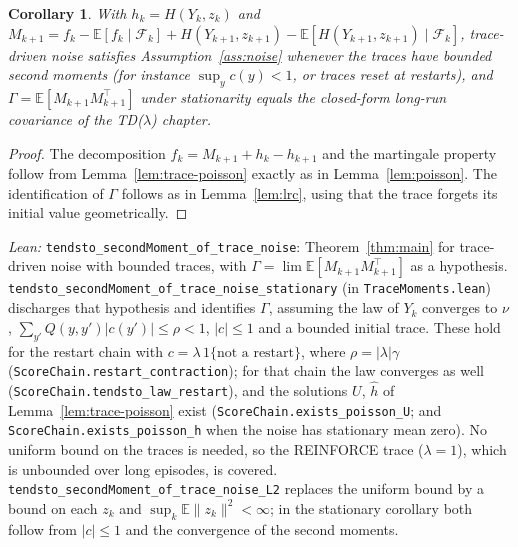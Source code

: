 \documentclass[11pt]{article}
\newtheorem{corollary}[theorem]{Corollary}
\theoremstyle{definition}
\theoremstyle{remark}
\newcommand{\E}{\mathbb{E}}
\newcommand{\F}{\mathcal{F}}
\begin{document}
\begin{corollary}\label{cor:trace}
With $h_k = H(Y_k,z_k)$ and $M_{k+1} = f_k - \E[f_k\mid\F_k] + H(Y_{k+1},z_{k+1}) -
\E[H(Y_{k+1},z_{k+1})\mid\F_k]$, trace-driven noise satisfies Assumption~\ref{ass:noise}
whenever the traces have bounded second moments (for instance $\sup_yc(y) < 1$, or
traces reset at restarts), and $\Gamma = \E[M_{k+1}M_{k+1}^\top]$ under stationarity equals
the closed-form long-run covariance of the TD($\lambda$) chapter.
\end{corollary}
\begin{proof}
The decomposition $f_k = M_{k+1} + h_k - h_{k+1}$ and the martingale property follow from
Lemma~\ref{lem:trace-poisson} exactly as in Lemma~\ref{lem:poisson}. The identification of
$\Gamma$ follows as in Lemma~\ref{lem:lrc}, using that the trace forgets its initial value
geometrically.
\end{proof}
\noindent\emph{Lean:} \texttt{tendsto\_secondMoment\_of\_trace\_noise}: Theorem~\ref{thm:main} for
trace-driven noise with bounded traces, with $\Gamma = \lim\E[M_{k+1}M_{k+1}^\top]$ as a hypothesis.
\texttt{tendsto\_secondMoment\_of\_trace\_noise\_stationary} (in \texttt{TraceMoments.lean}) discharges
that hypothesis and identifies $\Gamma$, assuming the law of $Y_k$ converges to $\nu$,
$\sum_{y'}Q(y,y')|c(y')| \le \rho < 1$, $|c| \le 1$ and a bounded initial trace. These hold for the
restart chain with $c = \lambda\,1\{\text{not a restart}\}$, where $\rho = |\lambda|\gamma$
(\texttt{ScoreChain.restart\_contraction}); for that chain the law converges as well
(\texttt{ScoreChain.tendsto\_law\_restart}), and the solutions $U$, $\hat h$ of
Lemma~\ref{lem:trace-poisson} exist (\texttt{ScoreChain.exists\_poisson\_U}; and
\texttt{ScoreChain.exists\_poisson\_h} when the noise has stationary mean zero). No uniform bound on the traces is needed, so the
REINFORCE trace ($\lambda = 1$), which is unbounded over long episodes, is covered.
\texttt{tendsto\_secondMoment\_of\_trace\_noise\_L2} replaces the uniform bound by a bound on each
$z_k$ and $\sup_k\E\|z_k\|^2 < \infty$; in the stationary corollary both follow from $|c| \le 1$ and
the convergence of the second moments.
\end{document}
